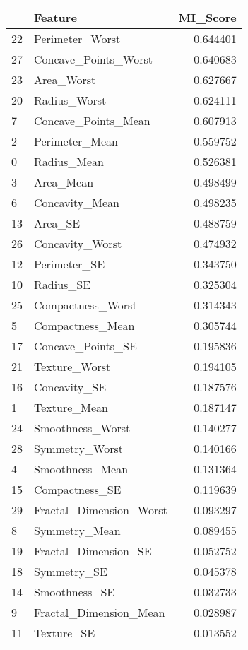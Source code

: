 \begin{tabular}{llr}
\toprule
 & Feature & MI_Score \\
\midrule
22 & Perimeter_Worst & 0.644401 \\
27 & Concave_Points_Worst & 0.640683 \\
23 & Area_Worst & 0.627667 \\
20 & Radius_Worst & 0.624111 \\
7 & Concave_Points_Mean & 0.607913 \\
2 & Perimeter_Mean & 0.559752 \\
0 & Radius_Mean & 0.526381 \\
3 & Area_Mean & 0.498499 \\
6 & Concavity_Mean & 0.498235 \\
13 & Area_SE & 0.488759 \\
26 & Concavity_Worst & 0.474932 \\
12 & Perimeter_SE & 0.343750 \\
10 & Radius_SE & 0.325304 \\
25 & Compactness_Worst & 0.314343 \\
5 & Compactness_Mean & 0.305744 \\
17 & Concave_Points_SE & 0.195836 \\
21 & Texture_Worst & 0.194105 \\
16 & Concavity_SE & 0.187576 \\
1 & Texture_Mean & 0.187147 \\
24 & Smoothness_Worst & 0.140277 \\
28 & Symmetry_Worst & 0.140166 \\
4 & Smoothness_Mean & 0.131364 \\
15 & Compactness_SE & 0.119639 \\
29 & Fractal_Dimension_Worst & 0.093297 \\
8 & Symmetry_Mean & 0.089455 \\
19 & Fractal_Dimension_SE & 0.052752 \\
18 & Symmetry_SE & 0.045378 \\
14 & Smoothness_SE & 0.032733 \\
9 & Fractal_Dimension_Mean & 0.028987 \\
11 & Texture_SE & 0.013552 \\
\bottomrule
\end{tabular}
